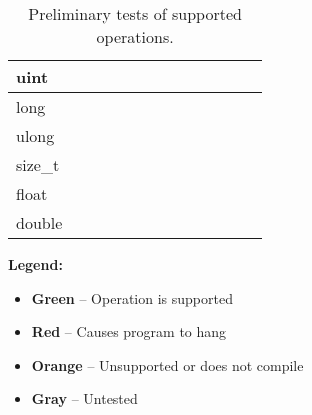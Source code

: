 \documentclass[conference]{IEEEtran}
\begin{document}
\begin{table*}[htbp]
{\begin{tabular}{|l|c|c|c|c|c|c|c|c|c|c|c|c|}
 \hline
 uint & \cellcolor{green!25} & \cellcolor{green!25} & \cellcolor{green!25} & \cellcolor{gray!30} & \cellcolor{gray!30} & \cellcolor{gray!30} & \cellcolor{gray!30} & \cellcolor{gray!30} & \cellcolor{gray!30} & \cellcolor{gray!30} & \cellcolor{gray!30} & \cellcolor{gray!30} \\
 \hline
 long & \cellcolor{orange!30} & \cellcolor{orange!30} & \cellcolor{orange!30} & \cellcolor{gray!30} & \cellcolor{gray!30} & \cellcolor{gray!30} & \cellcolor{gray!30} & \cellcolor{gray!30} & \cellcolor{gray!30} & \cellcolor{gray!30} & \cellcolor{gray!30} & \cellcolor{gray!30} \\
 \hline
 ulong & \cellcolor{orange!30} & \cellcolor{orange!30} & \cellcolor{orange!30} & \cellcolor{gray!30} & \cellcolor{gray!30} & \cellcolor{gray!30} & \cellcolor{gray!30} & \cellcolor{gray!30} & \cellcolor{gray!30} & \cellcolor{gray!30} & \cellcolor{gray!30} & \cellcolor{gray!30} \\
 \hline
 size\_t & \cellcolor{green!25} & \cellcolor{green!25} & \cellcolor{green!25} & \cellcolor{gray!30} & \cellcolor{gray!30} & \cellcolor{gray!30} & \cellcolor{gray!30} & \cellcolor{gray!30} & \cellcolor{gray!30} & \cellcolor{gray!30} & \cellcolor{gray!30} & \cellcolor{gray!30} \\
 \hline
 float & \cellcolor{green!25} & \cellcolor{green!25} & \cellcolor{green!25} & \cellcolor{green!25} & \cellcolor{green!25} & \cellcolor{green!25} & \cellcolor{green!25} & \cellcolor{orange!30} & \cellcolor{green!25} & \cellcolor{green!25} & \cellcolor{green!25} & \cellcolor{green!25} \\
 \hline
 double & \cellcolor{orange!30} & \cellcolor{orange!30} & \cellcolor{orange!30} & \cellcolor{gray!30} & \cellcolor{gray!30} & \cellcolor{gray!30} & \cellcolor{gray!30} & \cellcolor{gray!30} & \cellcolor{gray!30} & \cellcolor{gray!30} & \cellcolor{gray!30} & \cellcolor{gray!30} \\
 \hline
 \end{tabular}
 }
 \vspace{0.5em}
 \caption{Preliminary tests of supported operations.}
 \label{table:supported-ops}

 \vspace{0.5em}
\noindent \textbf{Legend:}
\begin{itemize}
    \item {} \textbf{Green} – Operation is supported
    \item {} \textbf{Red} – Causes program to hang
    \item {} \textbf{Orange} – Unsupported or does not compile
    \item {} \textbf{Gray} – Untested
\end{itemize}
 \end{table*}
\end{document}
